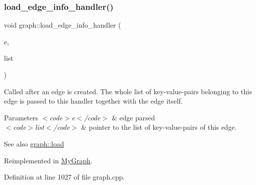 \mbox{\label{classgraph_ad049a2f8c191a7dc359e684ef56304d1}} 
\subsubsection{\texorpdfstring{load\+\_\+edge\+\_\+info\+\_\+handler()}{load\_edge\_info\_handler()}}
{\footnotesize\ttfamily void graph\+::load\+\_\+edge\+\_\+info\+\_\+handler (\begin{DoxyParamCaption}\item[{\mbox{\hyperlink{classedge}{edge}}}]{e,  }\item[{\mbox{\hyperlink{struct_g_m_l__pair}{G\+M\+L\+\_\+pair}} $\ast$}]{list }\end{DoxyParamCaption})\hspace{0.3cm}{\ttfamily [virtual]}}

Called after an edge is created. The whole list of key-\/value-\/pairs belonging to this edge is passed to this handler together with the edge itself.


\begin{DoxyParams}{Parameters}
{\em $<$code$>$e$<$/code$>$} & edge parsed \\
\hline
{\em $<$code$>$list$<$/code$>$} & pointer to the list of key-\/value-\/pairs of this edge. \\
\hline
\end{DoxyParams}
\begin{DoxySeeAlso}{See also}
\mbox{\hyperlink{classgraph_ac28cb3468623a480709d3329033d4ec8}{graph\+::load}} 
\end{DoxySeeAlso}


Reimplemented in \mbox{\hyperlink{class_my_graph_aae6f9d1beab66851272f9064e2058064}{My\+Graph}}.



Definition at line 1027 of file graph.\+cpp.


